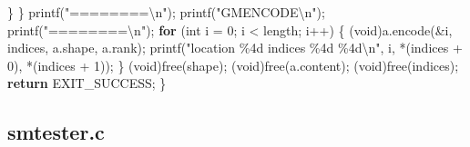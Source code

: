 \documentclass[
  12pt,
]{article}
\newenvironment{Shaded}{\begin{snugshade}}{\end{snugshade}}
\newcommand{\ControlFlowTok}[1]{\textcolor[rgb]{0.13,0.29,0.53}{\textbf{#1}}}
\newcommand{\DataTypeTok}[1]{\textcolor[rgb]{0.13,0.29,0.53}{#1}}
\newcommand{\DecValTok}[1]{\textcolor[rgb]{0.00,0.00,0.81}{#1}}
\newcommand{\NormalTok}[1]{#1}
\newcommand{\SpecialCharTok}[1]{\textcolor[rgb]{0.00,0.00,0.00}{#1}}
\newcommand{\StringTok}[1]{\textcolor[rgb]{0.31,0.60,0.02}{#1}}
\begin{document}
\begin{Shaded}
\begin{Highlighting}[]
\NormalTok{    \}}
\NormalTok{  \}}
\NormalTok{  printf(}\StringTok{"========}\SpecialCharTok{\textbackslash{}n}\StringTok{"}\NormalTok{);}
\NormalTok{  printf(}\StringTok{"GMENCODE}\SpecialCharTok{\textbackslash{}n}\StringTok{"}\NormalTok{);}
\NormalTok{  printf(}\StringTok{"========}\SpecialCharTok{\textbackslash{}n}\StringTok{"}\NormalTok{);}
  \ControlFlowTok{for}\NormalTok{ (}\DataTypeTok{int}\NormalTok{ i = }\DecValTok{0}\NormalTok{; i \textless{} length; i++) \{}
\NormalTok{    (}\DataTypeTok{void}\NormalTok{)a.encode(\&i, indices, a.shape, a.rank);}
\NormalTok{    printf(}\StringTok{"location \%4d indices \%4d \%4d}\SpecialCharTok{\textbackslash{}n}\StringTok{"}\NormalTok{, i, *(indices + }\DecValTok{0}\NormalTok{), *(indices + }\DecValTok{1}\NormalTok{));}
\NormalTok{  \}}
\NormalTok{  (}\DataTypeTok{void}\NormalTok{)free(shape);}
\NormalTok{  (}\DataTypeTok{void}\NormalTok{)free(a.content);}
\NormalTok{  (}\DataTypeTok{void}\NormalTok{)free(indices);}
  \ControlFlowTok{return}\NormalTok{ EXIT\_SUCCESS;}
\NormalTok{\}}
\end{Highlighting}
\end{Shaded}

\hypertarget{smtester.c}{%
\subsection{smtester.c}\label{smtester.c}}
\end{document}
